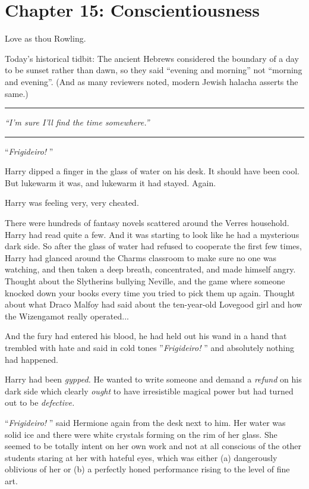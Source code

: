 \chapter{Chapter 15: Conscientiousness}
Love as thou Rowling.

Today's historical tidbit: The ancient Hebrews considered the boundary
of a day to be sunset rather than dawn, so they said ``evening and
morning'' not ``morning and evening''. (And as many reviewers noted,
modern Jewish halacha asserts the same.)

\begin{center}\rule{3in}{0.4pt}\end{center}

\emph{``I'm sure I'll find the time somewhere.''}

\begin{center}\rule{3in}{0.4pt}\end{center}

``\emph{Frigideiro!} ''

Harry dipped a finger in the glass of water on his desk. It should have
been cool. But lukewarm it was, and lukewarm it had stayed. Again.

Harry was feeling very, very cheated.

There were hundreds of fantasy novels scattered around the Verres
household. Harry had read quite a few. And it was starting to look like
he had a mysterious dark side. So after the glass of water had refused
to cooperate the first few times, Harry had glanced around the Charms
classroom to make sure no one was watching, and then taken a deep
breath, concentrated, and made himself angry. Thought about the
Slytherins bullying Neville, and the game where someone knocked down
your books every time you tried to pick them up again. Thought about
what Draco Malfoy had said about the ten-year-old Lovegood girl and how
the Wizengamot really operated...

And the fury had entered his blood, he had held out his wand in a hand
that trembled with hate and said in cold tones ''\emph{Frigideiro!} '' and
absolutely nothing had happened.

Harry had been \emph{gypped.} He wanted to write someone and demand a
\emph{refund} on his dark side which clearly \emph{ought} to have
irresistible magical power but had turned out to be \emph{defective.}

``\emph{Frigideiro!} '' said Hermione again from the desk next to him. Her
water was solid ice and there were white crystals forming on the rim of
her glass. She seemed to be totally intent on her own work and not at
all conscious of the other students staring at her with hateful eyes,
which was either (a) dangerously oblivious of her or (b) a perfectly
honed performance rising to the level of fine art.

